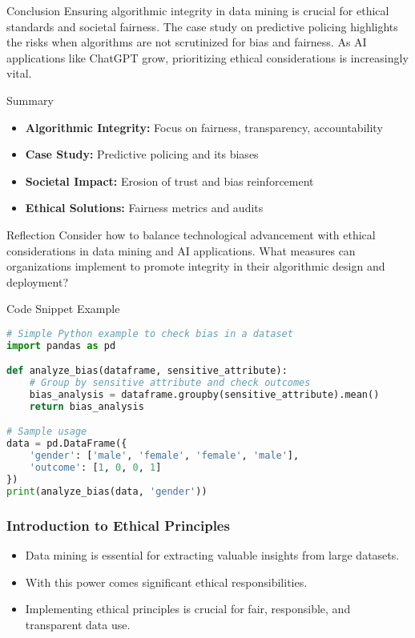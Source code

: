 \documentclass[aspectratio=169]{beamer}
\begin{document}
\begin{frame}[fragile]{Conclusion}
    Ensuring algorithmic integrity in data mining is crucial for ethical standards and societal fairness. The case study on predictive policing highlights the risks when algorithms are not scrutinized for bias and fairness. As AI applications like ChatGPT grow, prioritizing ethical considerations is increasingly vital.
\end{frame}

\begin{frame}[fragile]{Summary}
    \begin{itemize}
        \item \textbf{Algorithmic Integrity:} Focus on fairness, transparency, accountability
        \item \textbf{Case Study:} Predictive policing and its biases
        \item \textbf{Societal Impact:} Erosion of trust and bias reinforcement
        \item \textbf{Ethical Solutions:} Fairness metrics and audits
    \end{itemize}
\end{frame}

\begin{frame}[fragile]{Reflection}
    Consider how to balance technological advancement with ethical considerations in data mining and AI applications. What measures can organizations implement to promote integrity in their algorithmic design and deployment?
\end{frame}

\begin{frame}[fragile]{Code Snippet Example}
    \begin{lstlisting}[language=Python]
# Simple Python example to check bias in a dataset
import pandas as pd

def analyze_bias(dataframe, sensitive_attribute):
    # Group by sensitive attribute and check outcomes
    bias_analysis = dataframe.groupby(sensitive_attribute).mean()
    return bias_analysis

# Sample usage
data = pd.DataFrame({
    'gender': ['male', 'female', 'female', 'male'],
    'outcome': [1, 0, 0, 1]
})
print(analyze_bias(data, 'gender'))
    \end{lstlisting}
\end{frame}

\begin{frame}[fragile]
    \frametitle{Introduction to Ethical Principles}
    \begin{itemize}
        \item Data mining is essential for extracting valuable insights from large datasets.
        \item With this power comes significant ethical responsibilities.
        \item Implementing ethical principles is crucial for fair, responsible, and transparent data use.
    \end{itemize}
\end{frame}
\end{document}
